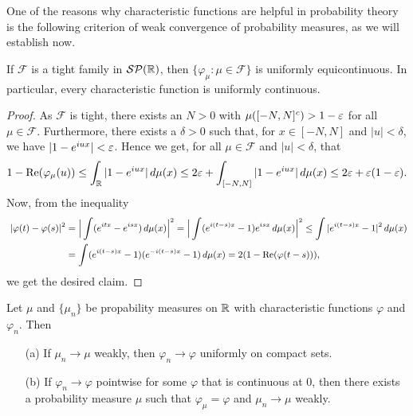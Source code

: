 One of the reasons why characteristic functions are helpful in probability
theory is the following criterion of weak convergence of probability measures, as we will establish now.
\begin{theorem}\label{tight family characteristic function}
If $\mathscr{F}$ is a tight family in $\mathcal{SP}(\R)$, then $\{\varphi_\mu:\mu\in\mathscr{F}\}$ is uniformly equicontinuous. In particular, every characteristic function is uniformly continuous.
\end{theorem}
\begin{proof}
As $\mathscr{F}$ is tight, there exists an $N>0$ with $\mu([-N,N]^c)>1-\eps$ for all $\mu\in\mathscr{F}$. Furthermore, there exists a $\delta>0$ such that, for $x\in[-N,N]$ and $|u|<\delta$, we have $|1-e^{iux}|<\eps$. Hence we get, for all $\mu\in\mathscr{F}$ and $|u|<\delta$, that
\begin{align*}
1-\Re(\varphi_\mu(u))\leq\int_{\R}|1-e^{iux}|\,d\mu(x)\leq 2\eps+\int_{[-N,N]}|1-e^{iux}|\,d\mu(x)\leq 2\eps+\eps(1-\eps).
\end{align*}
Now, from the inequality
\begin{equation*}\small\
\begin{aligned}
|\varphi(t)-\varphi(s)|^2&=\Big|\int(e^{itx}-e^{isx})\,d\mu(x)\Big|^2=\Big|\int(e^{i(t-s)x}-1)e^{isx}\,d\mu(x)\Big|^2\leq\int|e^{i(t-s)x}-1|^2\,d\mu(x)\\
&=\int(e^{i(t-s)x}-1)(e^{-i(t-s)x}-1)\,d\mu(x)=2(1-\Re(\varphi(t-s))),
\end{aligned}
\end{equation*}
we get the desired claim.
\end{proof}
\begin{theorem}
Let $\mu$ and $\{\mu_n\}$ be propability measures on $\R$ with characteristic functions $\varphi$ and $\varphi_n$. Then
\begin{itemize}
\item[(a)] If $\mu_n\to\mu$ weakly, then $\varphi_n\to\varphi$ uniformly on compact sets.
\item[(b)] If $\varphi_n\to\varphi$ pointwise for some $\varphi$ that is continuous at $0$, then there exists a probability measure $\mu$ such that $\varphi_\mu=\varphi$ and $\mu_n\to\mu$ weakly.
\end{itemize} 
\end{theorem}
